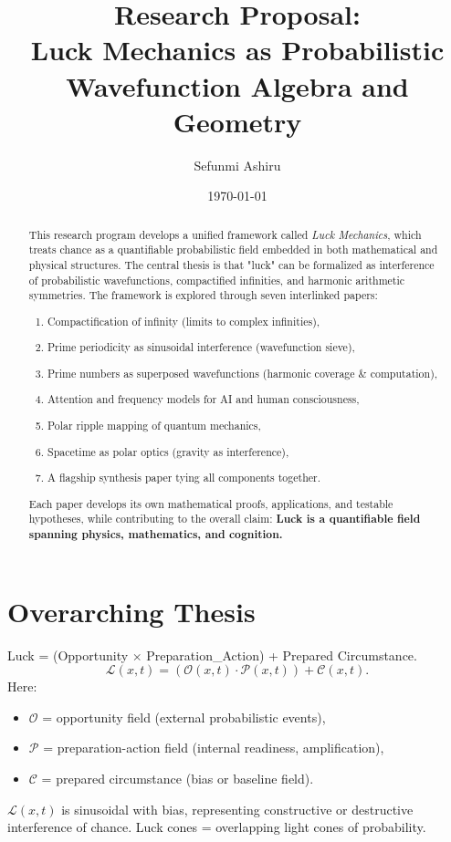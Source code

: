 \documentclass[12pt]{article}
\title{Research Proposal:\\
Luck Mechanics as Probabilistic Wavefunction Algebra and Geometry}
\author{Sefunmi Ashiru}
\date{\today}
\begin{document}
\maketitle

\begin{abstract}
This research program develops a unified framework called \emph{Luck Mechanics}, which treats chance as a quantifiable probabilistic field embedded in both mathematical and physical structures. The central thesis is that "luck" can be formalized as interference of probabilistic wavefunctions, compactified infinities, and harmonic arithmetic symmetries. The framework is explored through seven interlinked papers:
\begin{enumerate}
    \item Compactification of infinity (limits to complex infinities),
    \item Prime periodicity as sinusoidal interference (wavefunction sieve),
    \item Prime numbers as superposed wavefunctions (harmonic coverage \& computation),
    \item Attention and frequency models for AI and human consciousness,
    \item Polar ripple mapping of quantum mechanics,
    \item Spacetime as polar optics (gravity as interference),
    \item A flagship synthesis paper tying all components together.
\end{enumerate}
Each paper develops its own mathematical proofs, applications, and testable hypotheses, while contributing to the overall claim: \textbf{Luck is a quantifiable field spanning physics, mathematics, and cognition.}
\end{abstract}

\newpage
\tableofcontents
\newpage

\section{Overarching Thesis}
Luck = (Opportunity $\times$ Preparation\_Action) + Prepared Circumstance.
\[
\mathcal{L}(x,t) = (\mathcal{O}(x,t)\cdot \mathcal{P}(x,t)) + \mathcal{C}(x,t).
\]
Here:
\begin{itemize}
  \item $\mathcal{O}$ = opportunity field (external probabilistic events),
  \item $\mathcal{P}$ = preparation-action field (internal readiness, amplification),
  \item $\mathcal{C}$ = prepared circumstance (bias or baseline field).
\end{itemize}
$\mathcal{L}(x,t)$ is sinusoidal with bias, representing constructive or destructive interference of chance. 
Luck cones = overlapping light cones of probability.
\end{document}
